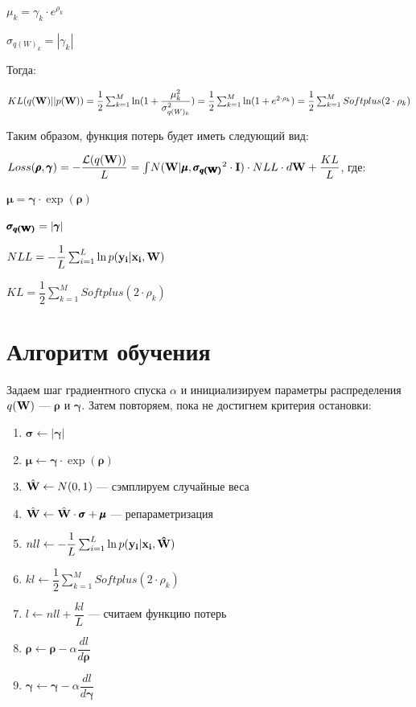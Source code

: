 \documentclass{article}
\begin{document}
$\mu_{k} = \gamma_{k} \cdot e^{\rho_{k}}$

$\sigma_{{q(W)_{k}}} = |\gamma_{k}|$

Тогда: 

$
KL(q(\bold{W}) || p(\bold{W})) = 
\dfrac{1}{2}\sum_{k=1}^{M}\ln({1 + \dfrac{\mu_{k}^2}{\sigma_{{q(W)_{k}}}^2}}) = 
\dfrac{1}{2}\sum_{k=1}^{M}\ln({1 + e^{2 \cdot \rho_{k}}}) = 
\dfrac{1}{2}\sum_{k=1}^{M}Softplus(2 \cdot \rho_{k})
$

Таким образом, функция потерь будет иметь следующий вид:

$
Loss(\pmb{\rho}, \pmb{\gamma}) =
- \dfrac{\mathcal{L}(q(\bold{W}))}{L} =
\int_{}{} N(\bold{W} | \pmb{\mu}, \pmb{\sigma_{q(\bold{W})}}^{2} \cdot \bold{I}) \cdot NLL \cdot d\bold{W} + \dfrac{KL}{L}
$, где:

$\pmb{\mu} = \pmb{\gamma} \cdot \exp({\pmb{\rho}})$

$\pmb{\sigma_{q(\bold{W})}} = |\pmb{\gamma}|$

$NLL = -\dfrac{1}{L}\sum_{i=1}^{L}{\ln{p( \bold{y_{i}} | \bold{x_{i}}, \bold{W})}}$

$KL = \dfrac{1}{2}\sum_{k=1}^{M}Softplus(2 \cdot \rho_{k})$

\section{Алгоритм обучения}
Задаем шаг градиентного спуска $\alpha$ и инициализируем параметры распределения $q(\bold{W})$ — $\pmb{\rho}$ и $\pmb{\gamma}$. Затем повторяем, пока не достигнем критерия остановки:
\begin{enumerate}
    \item $\pmb{\sigma} \leftarrow |\pmb{\gamma}|$
    \item $\pmb{\mu} \leftarrow \pmb{\gamma} \cdot \exp({\pmb{\rho}})$
    \item $\hat{\bold{W}} \leftarrow N(0, 1)$ — сэмплируем случайные веса
    \item $\hat{\bold{W}} \leftarrow \hat{\bold{W}} \cdot \pmb{\sigma} + \pmb{\mu}$ — репараметризация
    \item $nll \leftarrow -\dfrac{1}{L}\sum_{i=1}^{L}{\ln{p( \bold{y_{i}} | \bold{x_{i}}, \bold{\hat{W}})}}$
    \item $kl \leftarrow \dfrac{1}{2}\sum_{k=1}^{M}Softplus(2 \cdot \rho_{k})$
    \item $l \leftarrow nll + \dfrac{kl}{L}$ — считаем функцию потерь
    \item $\pmb{\rho} \leftarrow \pmb{\rho} - \alpha \dfrac{d l}{d \pmb{\rho}}$
    \item $\pmb{\gamma} \leftarrow \pmb{\gamma} - \alpha \dfrac{d l}{d \pmb{\gamma}}$
\end{enumerate}
\end{document}
